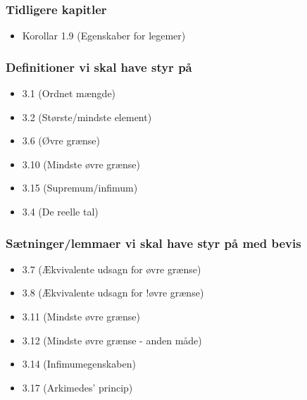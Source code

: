 \subsubsection{Tidligere kapitler}
\begin{itemize}
\setlength\itemsep{0em}
\item Korollar 1.9 (Egenskaber for legemer)
\end{itemize}
\subsubsection{Definitioner vi skal have styr på}
\begin{itemize}
\setlength\itemsep{0em}
\item 3.1 (Ordnet mængde)
\item 3.2 (Største/mindste element)
\item 3.6 (Øvre grænse)
\item 3.10 (Mindste øvre grænse)
\item 3.15 (Supremum/infimum)
\item 3.4 (De reelle tal)
\end{itemize}
\subsubsection{Sætninger/lemmaer vi skal have styr på med bevis}
\begin{itemize}
\setlength\itemsep{0em}
\item 3.7 (Ækvivalente udsagn for øvre grænse)
\item 3.8 (Ækvivalente udsagn for !øvre grænse)
\item 3.11 (Mindste øvre grænse)
\item 3.12 (Mindste øvre grænse - anden måde)
\item 3.14 (Infimumegenskaben)
\item 3.17 (Arkimedes' princip)
\end{itemize}
